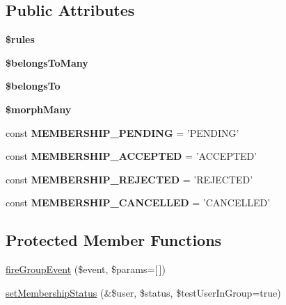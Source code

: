 \subsection*{Public Attributes}
\begin{DoxyCompactItemize}
\item 
{\bfseries \$rules}
\item 
{\bfseries \$belongs\+To\+Many}
\item 
{\bfseries \$belongs\+To}
\item 
{\bfseries \$morph\+Many}
\item 
\hypertarget{classDMA_1_1Friends_1_1Models_1_1UserGroup_a7c8222c3e74df7e5f392db954bc6e70b}{const {\bfseries M\+E\+M\+B\+E\+R\+S\+H\+I\+P\+\_\+\+P\+E\+N\+D\+I\+N\+G} = 'P\+E\+N\+D\+I\+N\+G'}\label{classDMA_1_1Friends_1_1Models_1_1UserGroup_a7c8222c3e74df7e5f392db954bc6e70b}

\item 
\hypertarget{classDMA_1_1Friends_1_1Models_1_1UserGroup_a7c23f715047baa55b359250eb7ec3936}{const {\bfseries M\+E\+M\+B\+E\+R\+S\+H\+I\+P\+\_\+\+A\+C\+C\+E\+P\+T\+E\+D} = 'A\+C\+C\+E\+P\+T\+E\+D'}\label{classDMA_1_1Friends_1_1Models_1_1UserGroup_a7c23f715047baa55b359250eb7ec3936}

\item 
\hypertarget{classDMA_1_1Friends_1_1Models_1_1UserGroup_a4d38303c9b869050114862be4674191f}{const {\bfseries M\+E\+M\+B\+E\+R\+S\+H\+I\+P\+\_\+\+R\+E\+J\+E\+C\+T\+E\+D} = 'R\+E\+J\+E\+C\+T\+E\+D'}\label{classDMA_1_1Friends_1_1Models_1_1UserGroup_a4d38303c9b869050114862be4674191f}

\item 
\hypertarget{classDMA_1_1Friends_1_1Models_1_1UserGroup_a40fdb6407bcd12e19a13706ced558e40}{const {\bfseries M\+E\+M\+B\+E\+R\+S\+H\+I\+P\+\_\+\+C\+A\+N\+C\+E\+L\+L\+E\+D} = 'C\+A\+N\+C\+E\+L\+L\+E\+D'}\label{classDMA_1_1Friends_1_1Models_1_1UserGroup_a40fdb6407bcd12e19a13706ced558e40}

\end{DoxyCompactItemize}
\subsection*{Protected Member Functions}
\begin{DoxyCompactItemize}
\item 
\hyperlink{classDMA_1_1Friends_1_1Models_1_1UserGroup_a1d29514398539f2e5579d0cc4c6a26fa}{fire\+Group\+Event} (\$event, \$params=\mbox{[}$\,$\mbox{]})
\item 
\hyperlink{classDMA_1_1Friends_1_1Models_1_1UserGroup_a7a52268ecbdd67ab80d28d65a8149a5a}{set\+Membership\+Status} (\&\$user, \$status, \$test\+User\+In\+Group=true)
\end{DoxyCompactItemize}
